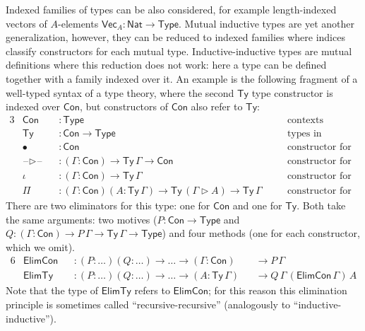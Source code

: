 \documentclass[dvipsnames]{lmcs} %
\newcommand{\ra}{\rightarrow}
\newcommand{\Con}{\mathsf{Con}}
\newcommand{\Ty}{\mathsf{Ty}}
\newcommand{\Nat}{\mathsf{Nat}}
\newcommand{\blank}{\mathord{\hspace{1pt}\text{--}\hspace{1pt}}}
\newcommand{\Elim}{\mathsf{Elim}}
\newcommand{\1}{\mathsf{1}} \renewcommand{\Pr}{\mathsf{Pr}}
\theoremstyle{plain}\newtheorem{satz}[thm]{Satz} %
\begin{document}
Indexed families of types can be also considered, for example length-indexed
vectors of $A$-elements $\mathsf{Vec}_A: \Nat \ra \mathsf{Type}$. Mutual
inductive types are yet another generalization, however, they can be reduced to
indexed families where indices classify constructors for each mutual type.
Inductive-inductive types \cite{forsberg-phd} are mutual definitions where this
reduction does not work: here a type can be defined together with a family
indexed over it. An example is the following fragment of a well-typed syntax of
a type theory, where the second $\Ty$ type constructor is indexed over $\Con$,
but constructors of $\Con$ also refer to $\Ty$:
\begin{alignat*}{3}
  & \Con && : \mathsf{Type} && \text{contexts} \\
  & \Ty  && : \Con \ra \mathsf{Type} && \text{types in contexts} \\
  & \bullet && : \Con && \text{constructor for the empty context} \\
  & \blank\rhd\blank && : (\Gamma:\Con)\ra\Ty\,\Gamma\ra\Con && \text{constructor for context extension} \\
  & \iota && : (\Gamma:\Con)\ra\Ty\,\Gamma && \text{constructor for a base type} \\
  & \Pi && : (\Gamma:\Con)(A:\Ty\,\Gamma)\ra\Ty\,(\Gamma\rhd A)\ra\Ty\,\Gamma \hspace{1em} && \text{constructor for dependent functions}
\end{alignat*}
There are two eliminators for this type: one for $\Con$ and one for
$\Ty$. Both take the same arguments: two motives ($P:\Con\ra\mathsf{Type}$ and
$Q:(\Gamma:\Con)\ra P\,\Gamma\ra\Ty\,\Gamma\ra\mathsf{Type}$) and four methods
(one for each constructor, which we omit).
\begin{alignat*}{6}
  & \Elim\Con && : (P:\dots)(Q:\dots)\ra\dots\ra(\Gamma:\Con) && \ra P\,\Gamma \\
  & \Elim\Ty  && : (P:\dots)(Q:\dots)\ra\dots\ra(A:\Ty\,\Gamma) && \ra Q\,\Gamma\,(\Elim\Con\,\Gamma)\,A
\end{alignat*}
Note that the type of $\Elim\Ty$ refers to $\Elim\Con$; for this reason
this elimination principle is sometimes called ``recursive-recursive''
(analogously to ``inductive-inductive'').
\end{document}
